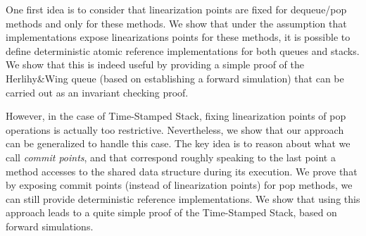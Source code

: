 One first idea is to consider that linearization points are fixed for dequeue/pop methods and only for these methods. We show that under the assumption that implementations expose linearizations points for these methods, it is possible to define deterministic atomic reference implementations for both queues and stacks. We show that this is indeed useful by providing a simple proof of the Herlihy\&Wing queue (based on establishing a forward simulation) that can be carried out as an invariant checking proof.

However, in the case of Time-Stamped Stack, fixing linearization points of pop operations is actually too restrictive. Nevertheless, we show that our approach can be generalized to handle this case. The key idea is to reason about what we call {\em commit points}, and  that correspond roughly speaking to the last point a method accesses to the shared data structure during its execution. We prove that by exposing commit points (instead of linearization points) for pop methods, we can still provide deterministic reference implementations. We show that using this approach leads to a quite simple proof of the Time-Stamped Stack, based on forward simulations.



